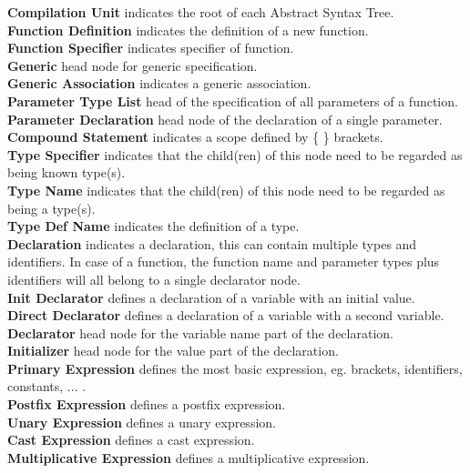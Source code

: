 \documentclass[12pt]{article}
\begin{document}
\begin{multicols}{2}
	\noindent
	\textbf{Compilation Unit} indicates the root of each Abstract Syntax Tree.\\
	\textbf{Function Definition} indicates the definition of a new function.\\
	\textbf{Function Specifier} indicates specifier of function.\\
	\textbf{Generic} head node for generic specification.\\
	\textbf{Generic Association} indicates a generic association.\\
	\textbf{Parameter Type List} head of the specification of all parameters of a function.\\
	\textbf{Parameter Declaration} head node of the declaration of a single parameter.\\
	\textbf{Compound Statement} indicates a scope defined by \{ \} brackets.\\
	\textbf{Type Specifier} indicates that the child(ren) of this node need to be regarded as being known type(s).\\
	\textbf{Type Name} indicates that the child(ren) of this node need to be regarded as being a type(s).\\
	\textbf{Type Def Name} indicates the definition of a type.\\
	\textbf{Declaration} indicates a declaration, this can contain multiple types and identifiers. In case of a function, the function name and parameter types plus identifiers will all belong to a single declarator node.\\
	\textbf{Init Declarator} defines a declaration of a variable with an initial value.\\
	\textbf{Direct Declarator} defines a declaration of a variable with a second variable.\\
	\textbf{Declarator} head node for the variable name part of the declaration.\\
	\textbf{Initializer} head node for the value part of the declaration.\\
	\textbf{Primary Expression} defines the most basic expression, eg. brackets, identifiers, constants, ... .\\
	\textbf{Postfix Expression} defines a postfix expression.\\
	\textbf{Unary Expression} defines a unary expression.\\
	\textbf{Cast Expression} defines a cast expression.\\
	\textbf{Multiplicative Expression} defines a multiplicative expression.\\

\end{multicols}
\end{document}
